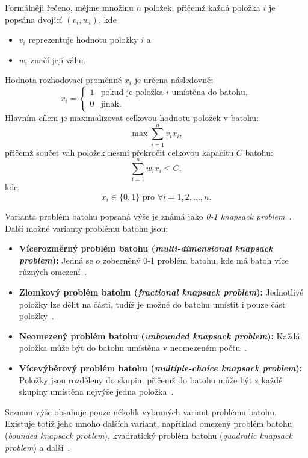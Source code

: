 Formálněji řečeno, mějme množinu $n$ položek, přičemž každá položka $i$ je popsána dvojicí $\left( v_i, w_i \right)$, kde
\begin{itemize}
    \item $v_i$ reprezentuje hodnotu položky $i$ a
    \item $w_i$ značí její váhu.
\end{itemize}
Hodnota rozhodovací proměnné $x_i$ je určena následovně:
\begin{equation*}
    x_i =
    \begin{cases}
        1 & \text{pokud je položka } i \text{ umístěna do batohu}, \\
        0 & \text{jinak}.
    \end{cases}    
\end{equation*}
Hlavním cílem je maximalizovat celkovou hodnotu položek v batohu:
\begin{equation*}
    \max \sum_{i=1}^{n} v_i x_i,
\end{equation*}
přičemž součet vah položek nesmí překročit celkovou kapacitu $C$ batohu:
\begin{equation} \label{eq:knapsack-capacity}
    \sum_{i=1}^{n} w_i x_i \leq C,
\end{equation}
kde:
\begin{equation*}
    x_i \in \{0,1\} \text{ pro } \forall i = 1,2,\dots,n.
\end{equation*}

Varianta problém batohu popsaná výše je známá jako \emph{0-1 knapsack problem}~\cite{knapsack01-survey}. 
Další možné varianty problému batohu jsou:
\begin{itemize}
    \item \textbf{Vícerozměrný problém batohu (\emph{multi-dimensional knapsack problem}):} Jed\-ná se o zobecněný 0-1 problém batohu, kde má batoh více různých omezení~\cite{multidimensional-knapsack}.
    \item \textbf{Zlomkový problém batohu (\emph{fractional knapsack problem}):} Jednotlivé položky lze dělit na části, tudíž je možné do batohu umístit i pouze část položky~\cite{IntroductionToAlgorithms}.
    \item \textbf{Neomezený problém batohu (\emph{unbounded knapsack problem}):} Každá položka může být do batohu umístěna v neomezeném počtu~\cite{unbounded-knapsack}.
    \item \textbf{Vícevýběrový problém batohu (\emph{multiple-choice knapsack problem}):} Položky jsou rozděleny do skupin, přičemž do batohu může být z každé skupiny umístěna nejvýše jedna položka~\cite{knapsack-problems}.
\end{itemize}
Seznam výše obsahuje pouze několik vybraných variant problému batohu. 
Existuje totiž jeho mnoho dalších variant, například omezený problém batohu (\emph{bounded knapsack problem}), kvadratický problém batohu (\emph{quadratic knapsack problem}) a další~\cite{knapsack-problems,knapsack-problems-overview-I,knapsack-problems-overview-II}.

